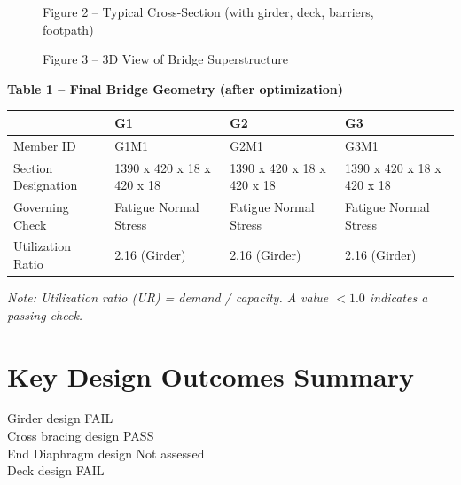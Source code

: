 \documentclass[12pt,a4paper]{report}
\numberwithin{table}{chapter}
\numberwithin{figure}{chapter}
\begin{document}
\newpage

\begin{figure}[H]
\centering
{}
\caption*{Figure 2 -- Typical Cross-Section (with girder, deck, barriers, footpath)}
\end{figure}

\begin{figure}[H]
\centering
{}
\caption*{Figure 3 -- 3D View of Bridge Superstructure}
\end{figure}

\noindent\textbf{Table 1 -- Final Bridge Geometry (after optimization)}

\vspace{0.4em}
\noindent
\begin{tabular}{|C{2.8cm}|C{4.1cm}|C{4.1cm}|C{4.1cm}|}
\hline
  \textbf{} &
  \textbf{G1} &
  \textbf{G2} &
  \textbf{G3} \\
\hline
Member ID & G1M1 & G2M1 & G3M1 \\
\hline
Section Designation & 1390 x 420 x 18 x 420 x 18 & 1390 x 420 x 18 x 420 x 18 & 1390 x 420 x 18 x 420 x 18 \\
\hline
Governing Check & Fatigue Normal Stress & Fatigue Normal Stress & Fatigue Normal Stress \\
\hline
Utilization Ratio & 2.16 (Girder) & 2.16 (Girder) & 2.16 (Girder) \\
\hline
\end{tabular}

\vspace{0.4em}
\noindent\textit{Note: Utilization ratio (UR) = demand / capacity. A value $< 1.0$ indicates a passing check.}

\vspace{1em}

\section*{Key Design Outcomes Summary}
\label{sec:key-outcomes}

\noindent Girder design FAIL \\
Cross bracing design PASS \\
End Diaphragm design Not assessed \\
Deck design FAIL
\end{document}
